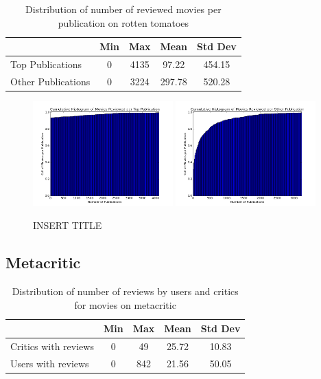 \documentclass[12pt]{article}
\begin{document}
	\begin{table}[H]
	 \centering
	 \caption{Distribution of number of reviewed movies per publication on rotten tomatoes} 
	 \begin{tabular}{ l | c | c | c | c }
	 \hline
	 &  Min & Max & Mean & Std Dev  \\
	 \hline
	 Top Publications & 0 & 4135 & 97.22 & 454.15 \\
	 Other Publications & 0 & 3224 & 297.78 & 520.28 \\
	 \hline
	 \end{tabular}
	 \end{table}

	 \begin{figure}[H]
	    \centering
	    \includegraphics[width=0.48\textwidth]{plots/plot_r_pub_top.png}
	    \includegraphics[width=0.48\textwidth]{plots/plot_r_pub_oth.png}
	    \caption{INSERT TITLE}
	    \label{fig:r_pub}
	\end{figure}

\subsection{Metacritic}


	\begin{table}[H]
	 \centering
	 \caption{Distribution of number of reviews by users and critics for movies on metacritic}

	 \begin{tabular}{ l | c | c | c | c }
	 \hline 
	 &  Min & Max & Mean & Std Dev  \\
	 \hline
	 Critics with reviews & 0 & 49 & 25.72 & 10.83 \\
	 Users with reviews & 0 & 842 & 21.56 & 50.05 \\
	 \hline
	 \end{tabular}
	 \end{table}
\end{document}

